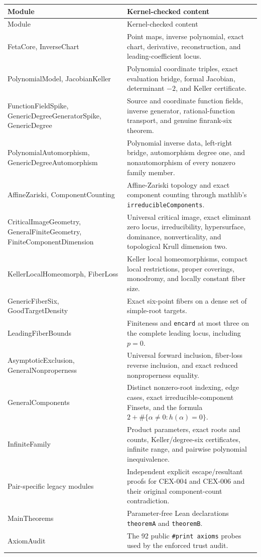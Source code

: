\documentclass[11pt]{article}
\begin{document}
\begin{longtable}{>{\raggedright\arraybackslash\ttfamily}p{}>{\raggedright\arraybackslash}p{}}
\toprule
Module & Kernel-checked content \\
\midrule
\endfirsthead
\toprule
Module & Kernel-checked content \\
\midrule
\endhead
FetaCore, InverseChart & Point maps, inverse polynomial, exact chart,
derivative, reconstruction, and leading-coefficient locus. \\
PolynomialModel, JacobianKeller & Polynomial coordinate triples, exact
evaluation bridge, formal Jacobian, determinant $-2$, and Keller certificate. \\
FunctionFieldSpike, GenericDegreeGenerator\-Spike, GenericDegree & Source and
coordinate function fields, inverse generator, rational-function transport,
and genuine finrank-six theorem. \\
PolynomialAutomorphism, GenericDegreeAutomorphism & Polynomial inverse data,
left-right bridge, automorphism degree one, and nonautomorphism of every
nonzero family member. \\
AffineZariski, ComponentCounting & Affine-Zariski topology and exact component
counting through mathlib's \texttt{irreducibleComponents}. \\
CriticalImageGeometry, GeneralFiniteGeometry, FiniteComponentDimension &
Universal critical image, exact eliminant zero locus, irreducibility,
hypersurface, dominance, nonverticality, and topological Krull dimension two. \\
KellerLocalHomeomorph, FiberLoss & Keller local homeomorphisms, compact local
restrictions, proper coverings, monodromy, and locally constant fiber size. \\
GenericFiberSix, GoodTargetDensity & Exact six-point fibers on a dense set of
simple-root targets. \\
LeadingFiberBounds & Finiteness and \texttt{encard} at most three on the
complete leading locus, including $p=0$. \\
AsymptoticExclusion, GeneralNonproperness & Universal forward inclusion,
fiber-loss reverse inclusion, and exact reduced nonproperness equality. \\
GeneralComponents & Distinct nonzero-root indexing, edge cases, exact
irreducible-component Finsets, and the formula
$2+\#\{\alpha\ne0:h(\alpha)=0\}$. \\
InfiniteFamily & Product parameters, exact roots and counts, Keller/degree-six
certificates, infinite range, and pairwise polynomial inequivalence. \\
Pair-specific legacy modules & Independent explicit escape/resultant proofs
for CEX-004 and CEX-006 and their original component-count contradiction. \\
MainTheorems & Parameter-free Lean declarations \texttt{theoremA} and
\texttt{theoremB}. \\
AxiomAudit & The 92 public \texttt{\#print axioms} probes used by the enforced
trust audit. \\
\bottomrule
\end{longtable}
\end{document}
